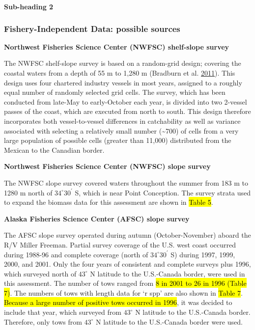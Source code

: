 \documentclass[12pt,]{article}
\begin{document}
\textbf{Sub-heading 2}

\subsubsection{Fishery-Independent Data: possible
sources}\label{fishery-independent-data-possible-sources}

\textbf{Northwest Fisheries Science Center (NWFSC) shelf-slope survey}

The NWFSC shelf-slope survey is based on a random-grid design; covering
the coastal waters from a depth of 55 m to 1,280 m (Bradburn et al.
\protect\hyperlink{ref-bradburn_2003_2011}{2011}). This design uses four
chartered industry vessels in most years, assigned to a roughly equal
number of randomly selected grid cells. The survey, which has been
conducted from late-May to early-October each year, is divided into two
2-vessel passes of the coast, which are executed from north to south.
This design therefore incorporates both vessel-to-vessel differences in
catchability as well as variance associated with selecting a relatively
small number (\textasciitilde{}700) of cells from a very large
population of possible cells (greater than 11,000) distributed from the
Mexican to the Canadian border.

\textbf{Northwest Fisheries Science Center (NWFSC) slope survey}

The NWFSC slope survey covered waters throughout the summer from 183 m
to 1280 m north of \(34^\circ 30^\prime\) S, which is near Point
Conception. The survey strata used to expand the biomass data for this
assessment are shown in \hl{Table 5}.

\textbf{Alaska Fisheries Science Center (AFSC) slope survey}

The AFSC slope survey operated during autumn (October-November) aboard
the R/V Miller Freeman. Partial survey coverage of the U.S. west coast
occurred during 1988-96 and complete coverage (north of
\(34^\circ 30^\prime\) S) during 1997, 1999, 2000, and 2001. Only the
four years of consistent and complete surveys plus 1996, which surveyed
north of \(43^\circ\) N latitude to the U.S.-Canada border, were used in
this assessment. The number of tows ranged from
\hl{8 in 2001 to 26 in 1996 (Table 7)}. The numbers of tows with length
data for `r spp' are also shown in \hl{Table 7}.
\hl{Because a large number of positive tows occurred in 1996}, it was
decided to include that year, which surveyed from \(43^\circ\) N
latitude to the U.S.-Canada border. Therefore, only tows from
\(43^\circ\) N latitude to the U.S.-Canada border were used.
\end{document}
